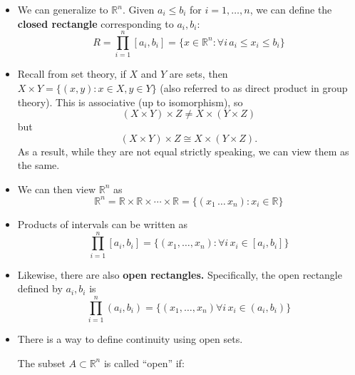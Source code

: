 \begin{itemize}
\begin{center}
\begin{tikzpicture}
              \end{tikzpicture}
          \end{center}
    \item We can generalize to $\mathbb{R}^n$. Given $a_i \le b_i$ for $i=1,\dots,n$, we can define the \textbf{closed rectangle} corresponding to $a_i,b_i$:
          \begin{equation}
              R = \prod_{i=1}^n [a_i,b_i] = \{x\in \mathbb{R}^n: \forall i\, a_i \le x_i \le b_i\}
          \end{equation}
    \item Recall from set theory, if $X$ and $Y$ are sets, then $X \times Y = \{(x,y): x\in X, y\in Y\}$ (also referred to as direct product in group theory). This is associative (up to isomorphism), so
          \begin{equation}
              (X\times Y) \times Z \neq X \times (Y\times Z)
          \end{equation}
          but
          \begin{equation}
              (X\times Y) \times Z \cong X \times (Y\times Z).
          \end{equation}
          As a result, while they are not equal strictly speaking, we can view them as the same.
    \item We can then view $\mathbb{R}^n$ as
          \begin{equation}
              \mathbb{R}^n = \mathbb{R} \times \mathbb{R} \times \cdots \times \mathbb{R} = \{(x_1\,\dots\, x_n):x_i \in \mathbb{R}\}
          \end{equation}
    \item Products of intervals can be written as
          \begin{equation}
              \prod_{i=1}^n [a_i,b_i] = \{(x_1,\dots,x_n): \forall i\, x_i \in [a_i,b_i]\}
          \end{equation}
    \item Likewise, there are also \textbf{open rectangles.} Specifically, the open rectangle defined by $a_i,b_i$ is
          \begin{equation}
              \prod_{i=1}^n (a_i,b_i) = \{ (x_1,\dots,x_n) \forall i\, x_i \in (a_i,b_i)\}
          \end{equation}
    \item There is a way to define continuity using open sets.
          \begin{definition}
              The subset $A \subset \mathbb{R}^n$ is called ``open'' if:
              \vspace{2mm}


\end{definition}
\end{itemize}
